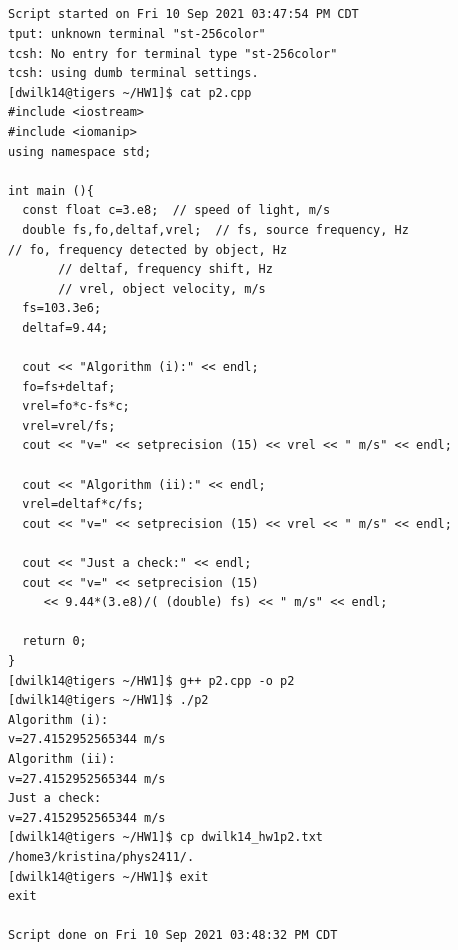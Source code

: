 \documentclass{article}
\begin{document}
\subsection{}
\begin{verbatim}
Script started on Fri 10 Sep 2021 03:47:54 PM CDT
tput: unknown terminal "st-256color"
tcsh: No entry for terminal type "st-256color"
tcsh: using dumb terminal settings.
[dwilk14@tigers ~/HW1]$ cat p2.cpp
#include <iostream>
#include <iomanip>
using namespace std;

int main (){
  const float c=3.e8;  // speed of light, m/s
  double fs,fo,deltaf,vrel;  // fs, source frequency, Hz        
// fo, frequency detected by object, Hz
       // deltaf, frequency shift, Hz
       // vrel, object velocity, m/s
  fs=103.3e6;
  deltaf=9.44;

  cout << "Algorithm (i):" << endl;
  fo=fs+deltaf;
  vrel=fo*c-fs*c;
  vrel=vrel/fs;
  cout << "v=" << setprecision (15) << vrel << " m/s" << endl;

  cout << "Algorithm (ii):" << endl;
  vrel=deltaf*c/fs;
  cout << "v=" << setprecision (15) << vrel << " m/s" << endl;

  cout << "Just a check:" << endl;
  cout << "v=" << setprecision (15)
     << 9.44*(3.e8)/( (double) fs) << " m/s" << endl;

  return 0;
}
[dwilk14@tigers ~/HW1]$ g++ p2.cpp -o p2
[dwilk14@tigers ~/HW1]$ ./p2
Algorithm (i):
v=27.4152952565344 m/s
Algorithm (ii):
v=27.4152952565344 m/s
Just a check:
v=27.4152952565344 m/s
[dwilk14@tigers ~/HW1]$ cp dwilk14_hw1p2.txt /home3/kristina/phys2411/.
[dwilk14@tigers ~/HW1]$ exit
exit

Script done on Fri 10 Sep 2021 03:48:32 PM CDT
\end{verbatim}
\end{document}
